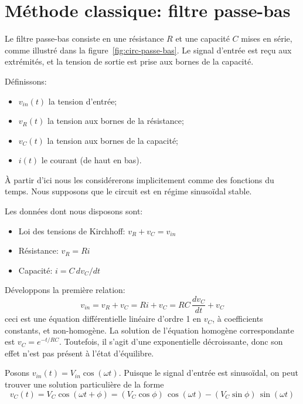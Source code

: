 \section{Méthode classique: filtre passe-bas}

Le filtre passe-bas consiste en une résistance $R$ et une capacité $C$
mises en série,
comme illustré dans la figure~\ref{fig:circ-passe-bas}.
Le signal d'entrée est reçu aux extrémités, et la tension de sortie est prise
aux bornes de la capacité.

Définissons:
\begin{itemize}
    \item $v_{in}(t)$ la tension d'entrée;
    \item $v_R(t)$ la tension aux bornes de la résistance;
    \item $v_C(t)$ la tension aux bornes de la capacité;
    \item $i(t)$ le courant (de haut en bas).
\end{itemize}

À partir d'ici nous les considérerons implicitement
comme des fonctions du temps.
Nous supposons que le circuit est en régime sinusoïdal stable.

Les données dont nous disposons sont:
\begin{itemize}
    \item Loi des tensions de Kirchhoff: $v_R + v_C = v_{in}$
    \item Résistance: $v_R = Ri$
    \item Capacité: $i = C\,dv_C/dt$
\end{itemize}

Développons la première relation:
\begin{equation}
    \label{eq:diff-passe-bas}
    v_{in} = v_R + v_C = Ri + v_C = RC\,\frac{dv_C}{dt} + v_C
\end{equation}
ceci est une équation différentielle linéaire d'ordre 1 en $v_C$,
à coefficients constants, et non-homogène.
La solution de l'équation homogène correspondante est $v_C = e^{-t/RC}$.
Toutefois, il s'agit d'une exponentielle décroissante,
donc son effet n'est pas présent à l'état d'équilibre.

Posons $v_{in}(t) = V_{in}\cos(\omega t)$.
Puisque le signal d'entrée est sinusoïdal, on peut trouver une solution
particulière de la forme
\[
    v_C(t) = V_C\cos(\omega t + \phi)
    = (V_C\cos\phi)\,\cos(\omega t) - (V_C\sin\phi)\,\sin(\omega t)
\]

